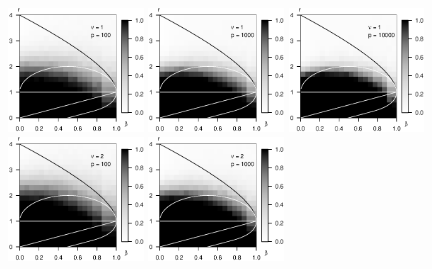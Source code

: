 \begin{figure}
      \centering
      \includegraphics[width=0.32\textwidth]{./sim_approx-exact_boundary/simulated_approx-exact_boundary_chi-squared_nu1_p100.eps}
      \includegraphics[width=0.32\textwidth]{./sim_approx-exact_boundary/simulated_approx-exact_boundary_chi-squared_nu1_p1000.eps}
      \includegraphics[width=0.32\textwidth]{./sim_approx-exact_boundary/simulated_approx-exact_boundary_chi-squared_nu1_p10000.eps}
      \includegraphics[width=0.32\textwidth]{./sim_approx-exact_boundary/simulated_approx-exact_boundary_chi-squared_nu2_p100.eps}
      \includegraphics[width=0.32\textwidth]{./sim_approx-exact_boundary/simulated_approx-exact_boundary_chi-squared_nu2_p1000.eps}

\end{figure}
